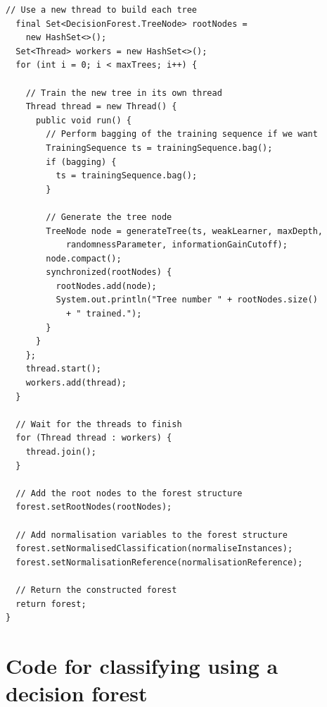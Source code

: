 \documentclass[12pt,twoside,notitlepage]{report}
\begin{document}
\begin{lstlisting}[float=tp,caption={The implementation code for training a decision forest.}, label={lst:actualTrainForest}]
  // Use a new thread to build each tree
  final Set<DecisionForest.TreeNode> rootNodes = 
    new HashSet<>();
  Set<Thread> workers = new HashSet<>(); 
  for (int i = 0; i < maxTrees; i++) {
    
    // Train the new tree in its own thread
    Thread thread = new Thread() {
      public void run() {
        // Perform bagging of the training sequence if we want
        TrainingSequence ts = trainingSequence.bag();
        if (bagging) {
          ts = trainingSequence.bag();
        }
        
        // Generate the tree node
        TreeNode node = generateTree(ts, weakLearner, maxDepth, 
            randomnessParameter, informationGainCutoff);
        node.compact();
        synchronized(rootNodes) {
          rootNodes.add(node);
          System.out.println("Tree number " + rootNodes.size() 
            + " trained.");
        }
      } 
    };
    thread.start();
    workers.add(thread);
  }
  
  // Wait for the threads to finish
  for (Thread thread : workers) {
    thread.join();
  }
  
  // Add the root nodes to the forest structure
  forest.setRootNodes(rootNodes);
  
  // Add normalisation variables to the forest structure
  forest.setNormalisedClassification(normaliseInstances);
  forest.setNormalisationReference(normalisationReference);
  
  // Return the constructed forest
  return forest;
}
      \end{lstlisting}












\cleardoublepage
\chapter{Code for classifying using a decision forest} \label{app:classify_tree}
\end{document}
